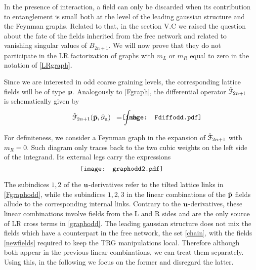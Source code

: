 \documentclass[a4paper,preprintnumbers,nofootinbib,twocolumn]{quantumarticle}
\begin{document}
In the presence of interaction, a field can only be discarded when its contribution to entanglement is small both at the level of
the leading gaussian structure and the Feynman graphs. 
Related to that, in the section V.C we raised the question about the fate of the fields inherited from the free network and related to vanishing singular values of $B_{2n+1}$.
We will now prove that they do not participate in the LR factorization of graphs with $m_L$ or $m_R$ equal to zero in the notation of \eqref{LRgraph}. 

Since we are interested in odd coarse graining levels, the corresponding lattice fields will be of type ${\bf p}$. 
Analogously to \eqref{Fgraph}, the differential operator ${\hat {\cal F}}_{2n+1}$ is schematically given by 
\vspace*{-3.2cm}
\begin{equation}
\hspace{-5mm} {\hat {\cal F}}_{2n+1}({\bar {\bf p}},\partial_{\bf u} )\;\; = \int \! d {\bf x} \!
\vcenter{ \hbox{\hspace{-9mm} \texttt{[image: Fdiffodd.pdf]}}}  \hspace{-6mm} \ . \hspace{-10mm} 
\label{Fgraphodd}
\end{equation}
\vspace*{-3.2cm}

\noindent For definiteness, we consider a Feynman graph in the expansion of  ${\hat {\cal F}}_{2n+1}$ with $m_R=0$. Such diagram only traces back to the two cubic weights on the left side of the integrand.  
Its external legs carry the expressions
\vspace*{-2.4cm}
\begin{equation}
\hspace{-4mm} \vcenter{ \hbox{\hspace{-9mm} \texttt{[image: graphodd2.pdf]}}} \hspace{-7mm}  \ .
\label{graphodd}
\end{equation}
\vspace*{-2.8cm}


\noindent %
The subindices $1,2$ of the ${\bf u}$-derivatives refer to the tilted lattice links in \eqref{Fgraphodd}, while the subindices $1,2,3$ in the linear combinations of the ${\bar {\bf p}}$ fields allude to the corresponding internal links. Contrary to the ${\bf u}$-derivatives, these linear combinations involve fields from the L and R sides and are the only source of LR cross terms in \eqref{graphodd}. 
The leading gaussian structure does not mix the fields which have a counterpart in the free network, the set \eqref{chain}, with the fields \eqref{newfields} required to keep the TRG manipulations local. Therefore although both appear in the previous linear combinations, we can treat them separately. Using this, in the following we focus on the former and disregard the latter. 
\end{document}
